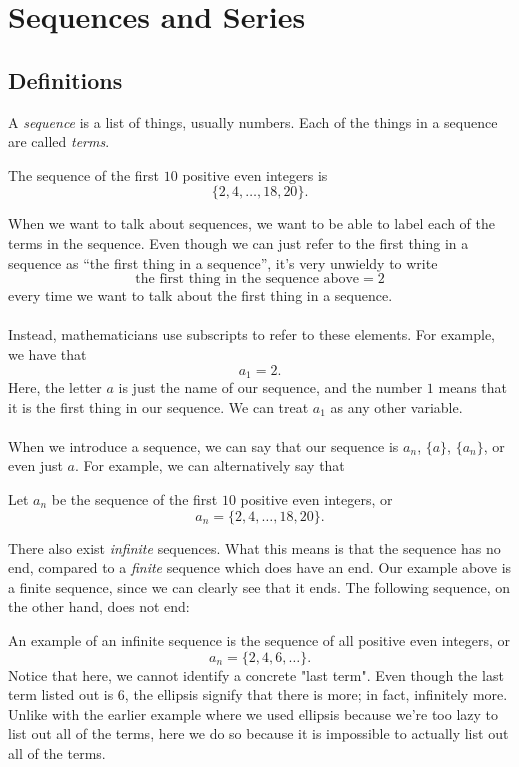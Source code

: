 \chapter{Sequences and Series}
\section{Definitions}
\begin{definition}
    A \emph{sequence} is a list of things, usually numbers. Each of the things in a sequence are called \emph{terms}.
\end{definition}
\begin{example}
    The sequence of the first $10$ positive even integers is
    \[\{2,4,\dots,18,20\}.\]
\end{example}
When we want to talk about sequences, we want to be able to label each of the terms in the sequence. Even though we can just refer to the first thing in a sequence as ``the first thing in a sequence'', it's very unwieldy to write
\[\text{the first thing in the sequence above}=2\]
every time we want to talk about the first thing in a sequence.
\\\\
Instead, mathematicians use subscripts to refer to these elements. For example, we have that
\[a_1=2.\]
Here, the letter $a$ is just the name of our sequence, and the number $1$ means that it is the first thing in our sequence. We can treat $a_1$ as any other variable.
\\\\
When we introduce a sequence, we can say that our sequence is $a_n$, $\{a\}$, $\{a_n\}$, or even just $a$. For example, we can alternatively say that
\begin{example}
    Let $a_n$ be the sequence of the first $10$ positive even integers, or
    \[a_n=\{2,4,\dots,18,20\}.\]
\end{example}
There also exist \emph{infinite} sequences. What this means is that the sequence has no end, compared to a \emph{finite} sequence which does have an end. Our example above is a finite sequence, since we can clearly see that it ends. The following sequence, on the other hand, does not end:
\begin{example}
    An example of an infinite sequence is the sequence of all positive even integers, or
    \[a_n=\{2,4,6,\dots\}.\]
    Notice that here, we cannot identify a concrete "last term". Even though the last term listed out is $6$, the ellipsis signify that there is more; in fact, infinitely more. Unlike with the earlier example where we used ellipsis because we're too lazy to list out all of the terms, here we do so because it is impossible to actually list out all of the terms.
\end{example}
